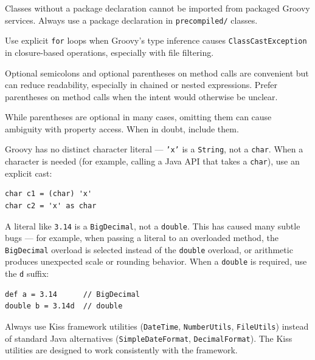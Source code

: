 \begin{description}[style=nextline]
  \item[Default package] Classes without a package declaration cannot be imported from packaged Groovy services.  Always use a package declaration in \texttt{precompiled/} classes.

  \item[Closure types] Use explicit \texttt{for} loops when Groovy's type inference causes \texttt{ClassCastException} in closure-based operations, especially with file filtering.

  \item[Optional syntax can hurt readability] Optional semicolons and optional parentheses on method calls are convenient but can reduce readability, especially in chained or nested expressions.  Prefer parentheses on method calls when the intent would otherwise be unclear.

  \item[Parentheses ambiguity] While parentheses are optional in many cases, omitting them can cause ambiguity with property access.  When in doubt, include them.

  \item[No \texttt{char} type] Groovy has no distinct character literal --- \texttt{'x'} is a \texttt{String}, not a \texttt{char}.  When a character is needed (for example, calling a Java API that takes a \texttt{char}), use an explicit cast:
  \begin{lstlisting}[style=groovy]
char c1 = (char) 'x'
char c2 = 'x' as char
  \end{lstlisting}

  \item[Floating-point literals are \texttt{BigDecimal}] A literal like \texttt{3.14} is a \texttt{BigDecimal}, not a \texttt{double}.  This has caused many subtle bugs --- for example, when passing a literal to an overloaded method, the \texttt{BigDecimal} overload is selected instead of the \texttt{double} overload, or arithmetic produces unexpected scale or rounding behavior.  When a \texttt{double} is required, use the \texttt{d} suffix:
  \begin{lstlisting}[style=groovy]
def a = 3.14      // BigDecimal
double b = 3.14d  // double
  \end{lstlisting}

  \item[Framework utilities] Always use Kiss framework utilities (\texttt{DateTime}, \texttt{NumberUtils}, \texttt{FileUtils}) instead of standard Java alternatives (\texttt{SimpleDateFormat}, \texttt{DecimalFormat}).  The Kiss utilities are designed to work consistently with the framework.
\end{description}
